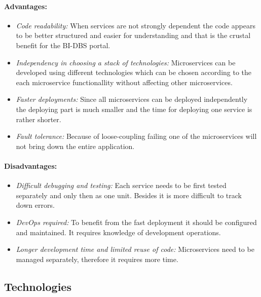 \paragraph*{Advantages:}
\begin{itemize}
  \item \emph{Code readability:} When services are not strongly dependent the code appears to be better structured and easier for understanding and that is the crustal benefit for the BI-DBS portal.
  
  \item \emph{Independency in choosing a stack of technologies:} Microservices can be developed using different technologies which can be chosen according to the each microservice functionallity without affecting other microservices.
  
  \item \emph{Faster deployments:} Since all microservices can be deployed independently the deploying part is much smaller and the time for deploying one service is rather shorter.

  \item \emph{Fault tolerance:} Because of loose-coupling failing one of the microservices will not bring down the entire application.
\end{itemize}

\paragraph*{Disadvantages:}
\begin{itemize}
  \item \emph{Difficult debugging and testing:} Each service needs to be first tested separately and only then as one unit. Besides it is more difficult to track down errors.

  \item \emph{DevOps required:} To benefit from the fast deployment it should be configured and maintained. It requires knowledge of development operations.

  \item \emph{Longer development time and limited reuse of code:} Microservices need to be managed separately, therefore it requires more time.
\end{itemize}



\subsection{Technologies}

